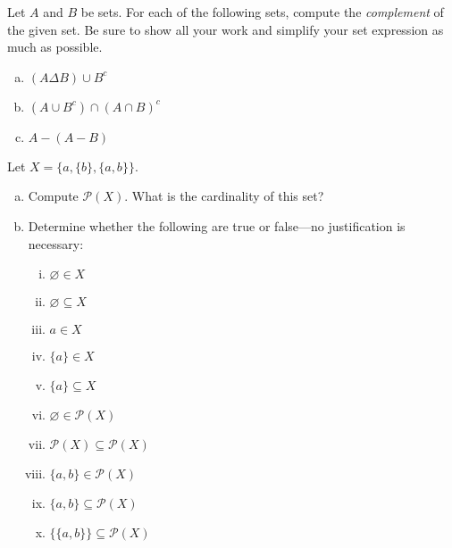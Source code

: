 \documentclass[11pt,letterpaper]{article}
\begin{document}

 Let $A$ and $B$ be sets. For each of the following sets, compute the \textit{complement} of the given set. Be sure to show all your work and simplify your set expression as much as possible. 
	\begin{enumerate}[(a)]
	\item $(A \Delta B) \cup B^c$
	\item $(A \cup B^c) \cap (A \cap B)^c$
	\item$A - (A - B)$
	\end{enumerate}



\newpage



 Let $X= \{ a, \{ b \}, \{ a, b \} \}$. 
	\begin{enumerate}[(a)]
	\item Compute $\mathcal{P}(X)$. What is the cardinality of this set?
	\item Determine whether the following are true or false---no justification is necessary:
		\begin{multicols}{2}
		\begin{enumerate}[(i)]
		\item $\varnothing \in X$
		\item $\varnothing \subseteq X$
		\item $a \in X$
		\item $\{ a \} \in X$
		\item $\{ a \} \subseteq X$
		\item $\varnothing \in \mathcal{P}(X)$
		\item $\mathcal{P}(X) \subseteq \mathcal{P}(X)$
		\item $\{ a, b \} \in \mathcal{P}(X)$
		\item $\{ a, b \} \subseteq \mathcal{P}(X)$
		\item $\{ \{ a, b \} \} \subseteq \mathcal{P}(X)$
		\end{enumerate}
		\end{multicols}
	\end{enumerate}



\newpage
\end{document}

